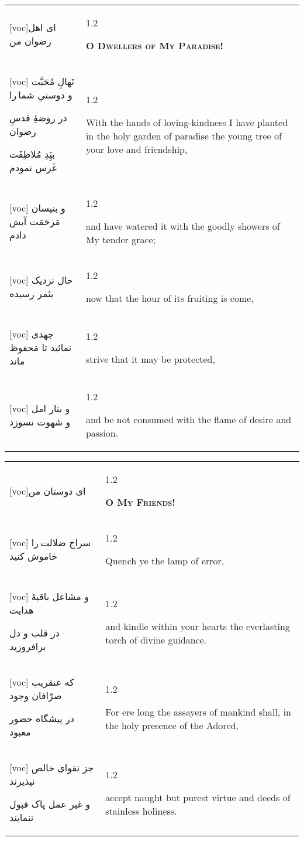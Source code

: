 \documentclass[11pt]{article}
\makeatletter
\newenvironment{orig}
  {\begin{farsi}[voc]}
  {\end{farsi}}
\newenvironment{trans}
  {\Large\begin{spacing}{1.2}\raggedright}
  {\end{spacing}}
\newenvironment{word}
  {\begin{tabular}[t]{p{2.75in}@{\hspace{3em}}p{2.75in}}}
  {\end{tabular}}
\newcommand{\ayat}[2]{\begin{orig}#1\end{orig} & \begin{trans}#2\end{trans}}
\newcommand{\heading}[2]{\textsc{\textbf{#1}} %
}
\makeatother
\begin{document}
\pagebreak

\begin{word}
\ayat{ای اهل رضوان من}{\heading{O Dwellers of My Paradise!}{}} \\ \ayat{
نَهالِ مُحَبَّت و دوستیِ شما را

در روضۀِ قدسِ رضوان

بيَِدِ مُلاطِفَت غَرس نمودم
}{With the hands of loving-kindness I have planted in the holy garden of
  paradise the young tree of your love and friendship,} \vspace{-1ex}\\ \ayat{
و بنيسان مَرحَمَت آبش دادم
}{and have watered it with the goodly showers of My tender grace;} \vspace{-1ex}\\ \ayat{
حال نزديک بثمر رسيده
}{now that the hour of its fruiting is come,} \vspace{-1ex}\\ \ayat{
جهدی نمائيد تا مَحفوظ ماند
}{strive that it may be protected,} \vspace{-1ex}\\ \ayat{
و بنار امل و شهوت نسوزد
}{and be not consumed with the flame of desire and passion.}
\end{word}

\pagebreak

\begin{word}
\ayat{ای دوستان من}{\heading{O My Friends!}{}} \\ \ayat{
سراج ضلالت را خاموش کنيد
}{Quench ye the lamp of error,} \vspace{-1ex}\\ \ayat{
و مشاعل باقيۀ هدايت

در قلب و دل برافروزيد
}{and kindle within your hearts the everlasting torch of divine
  guidance.} \\ \ayat{
که عنقريب صرّافان وجود

در پيشگاه حضور معبود
}{For ere long the assayers of mankind shall, in the holy presence of the
  Adored,} \vspace{-1ex}\\ \ayat{
جز تقوای خالص نپذيرند

و غير عمل پاک قبول ننمايند
}{accept naught but purest virtue and deeds of stainless holiness.}
\end{word}

\pagebreak
\end{document}
